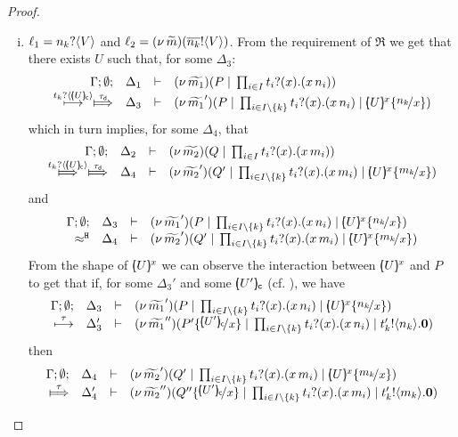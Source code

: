 \begin{proof}
\begin{enumerate}
\begin{enumerate}[i.]
					\item	$\ell_1 = n_k ? \langle V \rangle$ and $\ell_2 = (\nu\, \widetilde{m})(\overline{n_k} ! \langle V \rangle)$.
							From the requirement of $\Re$ we get that there exists $U$
							such that, for some $\Delta_3$:
							\[
								\mhorel{\Gamma}{\Delta_1}{ \newsp{\widetilde{m_1}}{P \Par \prod_{i \in I} \binp{t_i}{x} (\appl{x}{n_i})}}
								{ \hby{ \bactinp{t_k}{ \omapchar{U} }} \Hby{\dtau} }
								{\Delta_3}{}{  \newsp{\widetilde{m_1}'}{P \Par \prod_{i \in I\backslash{\set{k}}} \binp{t_i}{x} (\appl{x}{n_i})
								\Par  \mapchar{U}{x} \subst{n_k}{x} }}
							\]
							which in turn implies, for some $\Delta_4$, that
							\[
								\mhorel{\Gamma}{\Delta_2}{ \newsp{\widetilde{m_2}}{Q \Par \prod_{i \in I} \binp{t_i}{x} (\appl{x}{m_i})}}
								{ \Hby{ \bactinp{t_k}{ \omapchar{U} }} \Hby{\dtau} }
								{\Delta_4}{}{  \newsp{\widetilde{m_2}'}{Q' \Par \prod_{i \in I\backslash{\set{k}}} \binp{t_i}{x} (\appl{x}{m_i})
								\Par  \mapchar{U}{x} \subst{m_k}{x} }}
							\]
							and
							\[
								\mhorel{\Gamma}{\Delta_3}{  \newsp{\widetilde{m_1}'}{P \Par \prod_{i \in I\backslash{\set{k}}} \binp{t_i}{x} (\appl{x}{n_i})
								\Par  \mapchar{U}{x} \subst{n_k}{x} }}
								{\hwb}
								{\Delta_4}{}{  \newsp{\widetilde{m_2}'}{Q' \Par \prod_{i \in I\backslash{\set{k}}} \binp{t_i}{x} (\appl{x}{m_i})
								\Par  \mapchar{U}{x} \subst{m_k}{x} }}
							\]
							From the shape of $[\!\!(U)\!\!]^{x}$ we can observe the
							interaction between $[\!\!(U)\!\!]^{x}$ and $P$ to
							get that if, for some $\Delta_3'$ and some  $[\!\!(U')\!\!]_{\mathsf{c}}$ (cf. ), 
							we have
							\[
							\mhorel{\Gamma}{\Delta_3}{  \newsp{\widetilde{m_1}'}{P \Par \prod_{i \in I\backslash{\set{k}}} \binp{t_i}{x} (\appl{x}{n_i})
									\Par  \mapchar{U}{x} \subst{n_k}{x} }}
							{ \hby{\tau} }
							{\Delta_3'}{}{  \newsp{\widetilde{m_1}''}{P' \subst{\omapchar{U'}}{x} \Par \prod_{i \in I\backslash{\set{k}}} \binp{t_i}{x} (\appl{x}{n_i}) \Par
							\bout{t'_k}{n_k} \inact}}
							\]
							then
							\begin{eqnarray*}
								\mhorel{\Gamma}{\Delta_4}{  \newsp{\widetilde{m_2}'}{Q' \Par \prod_{i \in I\backslash{\set{k}}} \binp{t_i}{x} (\appl{x}{m_i})
										\Par  \mapchar{U}{x} \subst{m_k}{x} }}
								{ \Hby{\tau} }
								{\Delta_4'}{}{  \newsp{\widetilde{m_2}''}{Q'' \subst{\omapchar{U'}}{x} \Par \prod_{i \in I\backslash{\set{k}}} \binp{t_i}{x} (\appl{x}{m_i}) \Par
								\bout{t'_k}{m_k} \inact }}

\end{eqnarray*}
\end{enumerate}
\end{enumerate}
\end{proof}
